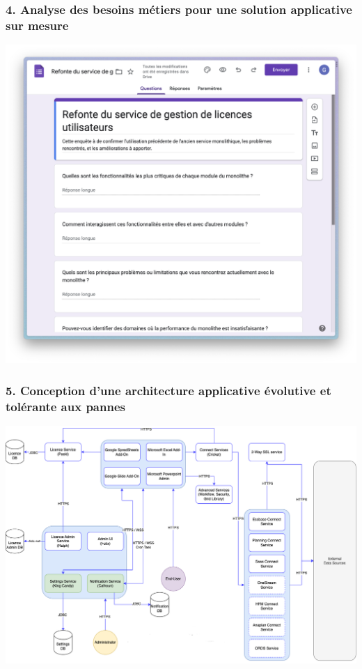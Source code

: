 \documentclass[aspectratio=169]{beamer}
\begin{document}
\begin{frame}
  \frametitle{4. Analyse des besoins métiers pour une solution applicative sur mesure}
  \includegraphics[height=0.80\textheight, center]{Imgs/enquete-utilisateur.png}
\end{frame}

\begin{frame}
  \frametitle{5. Conception d’une architecture applicative évolutive et tolérante aux pannes}
  \includegraphics[height=0.75\textheight, center]{Imgs/schema-qibates-v2.png}
\end{frame}
\end{document}
